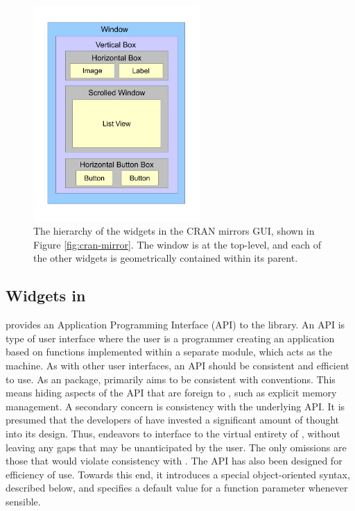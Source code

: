 \documentclass[article]{jss}
\begin{document}
\begin{figure}[thp]
\begin{center}
\includegraphics[width=2.5in]{widget-hierarchy.pdf}
\caption{\label{fig:widget-hierarchy}The hierarchy of the widgets in the CRAN
mirrors GUI, shown in Figure \ref{fig:cran-mirror}. The window is at the top-level,
and each of the other widgets is geometrically contained within its parent.}
\end{center}
\end{figure}

\subsection[GTK+ Widgets in R]{ Widgets in }

 provides an Application Programming Interface (API) to the  
library. An API is type of user interface where the user
is a programmer creating an application based on functions implemented within a 
separate module, which acts as the machine. As with other user interfaces,
an API should be consistent and efficient to use. As an  package,
 primarily aims to be consistent with  conventions. This
means hiding aspects of the  API that are foreign to ,
such as explicit memory management. A secondary concern is consistency 
with the underlying  API. It is presumed that the developers of
 have invested a significant amount of thought into its design. Thus,
 endeavors to interface  to the virtual entirety of ,
without leaving any gaps that may be unanticipated by the user. 
The only omissions are those that would violate consistency with .
The  API has also been designed for efficiency of use. Towards this end,
it introduces a special object-oriented syntax, described below, and specifies
a default value for a function parameter whenever sensible.
\end{document}
